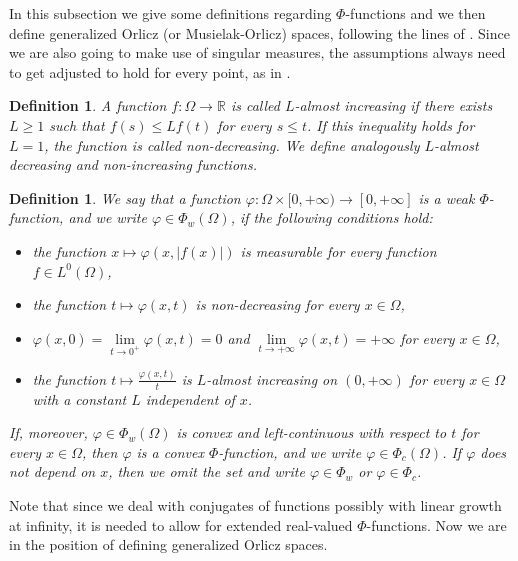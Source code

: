 \documentclass[a4paper,11pt,oneside,notitlepage]{article}
\newtheorem{definition}[theorem]{Definition}
\numberwithin{equation}{section}
\def\R{\mathbb{R}}
\newcommand{\vphi}{\varphi}
\begin{document}
In this subsection we give some definitions regarding $\Phi$-functions and we then define generalized Orlicz (or Musielak-Orlicz) spaces, following the lines of \cite{HaH}. Since we are also going to make use of singular measures, the assumptions always need to get adjusted to hold for every point, as in \cite{HJR}.

\begin{definition}
    A function $f : \Omega \to \R$ is called $L$-almost increasing if there exists $L \ge 1$ such that $f(s) \le L f(t)$ for every $s \le t$. If this inequality holds for $L = 1$, the function is called non-decreasing. We define analogously $L$-almost decreasing and non-increasing functions.
\end{definition}

\begin{definition}
\label{def:phi-functions}
    We say that a function $\vphi: \Omega \times [0, +\infty) \to [0, +\infty]$ is a weak $\Phi$-function, and we write $\vphi \in \Phi_w(\Omega)$, if the following conditions hold:
    \begin{itemize}
        \item the function $x \mapsto \vphi(x,|f(x)|)$ is measurable for every function $f \in L^0(\Omega)$,
        \item the function $t \mapsto \vphi(x,t)$ is non-decreasing for every $x \in \Omega$,
        \item $\vphi(x,0) = \underset{t \to 0^+}{\lim} \vphi(x,t) = 0$ and $\underset{t \to +\infty}{\lim} \vphi(x,t) = +\infty$ for every $x \in \Omega$,
        \item the function $t \mapsto \tfrac{\vphi(x, t)}{t}$ is $L$-almost increasing on $(0,+\infty)$ for every $x \in \Omega$ with a constant $L$ independent of $x$.
    \end{itemize}
    If, moreover, $\vphi \in \Phi_w(\Omega)$ is convex and left-continuous with respect to $t$ for every $x \in \Omega$, then $\vphi$ is a convex $\Phi$-function, and we write $\vphi \in \Phi_c(\Omega)$. If $\vphi$ does not depend on $x$, then we omit the set and write $\vphi \in \Phi_w$ or $\vphi \in \Phi_c$.
\end{definition}

Note that since we deal with conjugates of functions possibly with linear growth at infinity, it is needed to allow for extended real-valued $\Phi$-functions. Now we are in the position of defining generalized Orlicz spaces.
\end{document}
